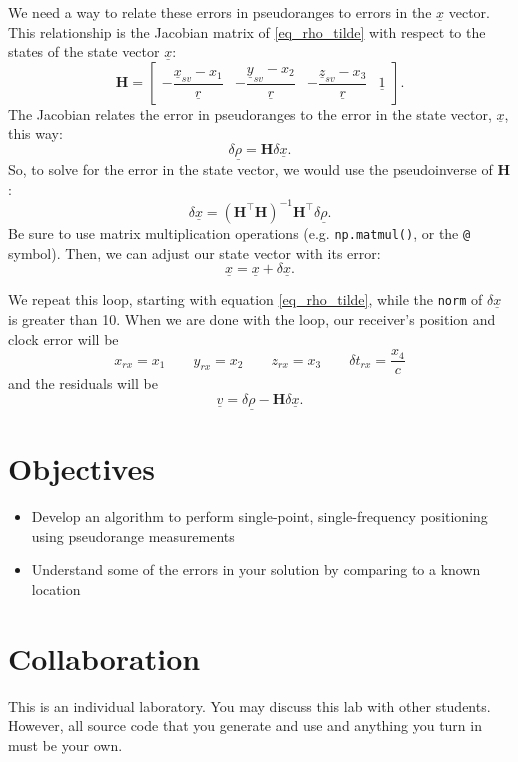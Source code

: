 \documentclass[12pt]{article}
\renewcommand{\vec}[1]     {\underline{#1}}
\begin{document}
We need a way to relate these errors in pseudoranges to errors in the
$\vec{x}$ vector.  This relationship is the Jacobian matrix of
\eqref{eq_rho_tilde} with respect to the states of the state vector $\vec{x}$:
\[ \bm{H} = \begin{bmatrix}
      -\dfrac{\vec{x}_{sv} - x_1}{\vec{r}} &
      -\dfrac{\vec{y}_{sv} - x_2}{\vec{r}} &
      -\dfrac{\vec{z}_{sv} - x_3}{\vec{r}} & \vec{1}
   \end{bmatrix} . \]
The Jacobian relates the error in pseudoranges to the error in the state vector,
$\vec{x}$, this way:
\[ \delta \vec{\rho} = \bm{H} \delta \vec{x} . \]
So, to solve for the error in the state vector, we would use the pseudoinverse
of $\bm{H}$:
\[ \delta \vec{x} = (\bm{H}^\top \bm{H})^{-1} \bm{H}^\top
   \delta \vec{\rho} . \]
Be sure to use matrix multiplication operations (e.g. \lstinline{np.matmul()}, 
or the \lstinline{@} symbol).  Then, we can adjust our state vector with its error:
\[ \vec{x} = \vec{x} + \delta \vec{x} . \]

We repeat this loop, starting with equation \eqref{eq_rho_tilde}, while the
\lstinline{norm} of $\delta \vec{x}$ is greater than 10.  When we are done with
the loop, our receiver's position and clock error will be
\[ x_{rx} = x_1 \qquad
   y_{rx} = x_2 \qquad
   z_{rx} = x_3 \qquad
   \delta t_{rx} = \frac{x_4}{c} \]
and the residuals will be
\[ \vec{v} = \delta \vec{\rho} - \bm{H} \delta \vec{x} . \]

\section*{\textsf{Objectives}}

\begin{itemize}
   \item Develop an algorithm to perform single-point, single-frequency
      positioning using pseudorange measurements
   \item Understand some of the errors in your solution by comparing to a known
      location
\end{itemize}

\section*{\textsf{Collaboration}}

This is an individual laboratory.  You may discuss this lab with other students.
However, all source code that you generate and use and anything you turn in must
be your own.
\end{document}
